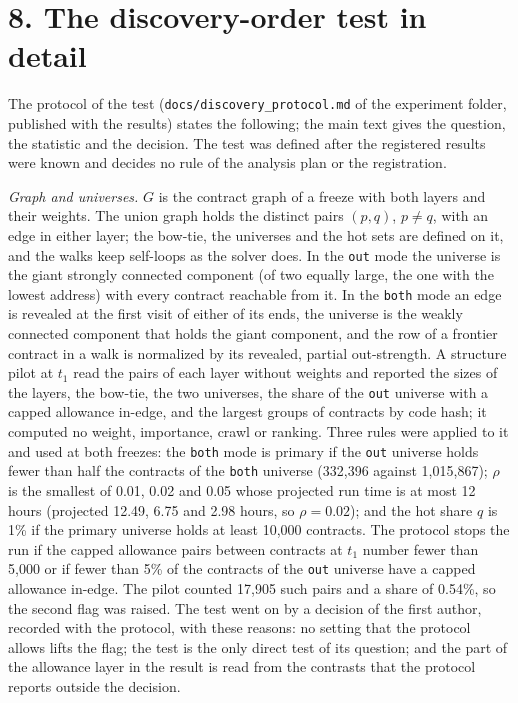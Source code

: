 \documentclass[10pt,letterpaper]{article}
\begin{document}
\section*{8. The discovery-order test in detail}
The protocol of the test (\texttt{docs/discovery\_protocol.md} of the experiment folder, published with the results) states the following; the main text gives the question, the statistic and the decision. The test was defined after the registered results were known and decides no rule of the analysis plan or the registration.

\textit{Graph and universes.} $G$ is the contract graph of a freeze with both layers and their weights. The union graph holds the distinct pairs $(p,q)$, $p\neq q$, with an edge in either layer; the bow-tie, the universes and the hot sets are defined on it, and the walks keep self-loops as the solver does. In the \texttt{out} mode the universe is the giant strongly connected component (of two equally large, the one with the lowest address) with every contract reachable from it. In the \texttt{both} mode an edge is revealed at the first visit of either of its ends, the universe is the weakly connected component that holds the giant component, and the row of a frontier contract in a walk is normalized by its revealed, partial out-strength. A structure pilot at $t_1$ read the pairs of each layer without weights and reported the sizes of the layers, the bow-tie, the two universes, the share of the \texttt{out} universe with a capped allowance in-edge, and the largest groups of contracts by code hash; it computed no weight, importance, crawl or ranking. Three rules were applied to it and used at both freezes: the \texttt{both} mode is primary if the \texttt{out} universe holds fewer than half the contracts of the \texttt{both} universe (332,396 against 1,015,867); $\rho$ is the smallest of 0.01, 0.02 and 0.05 whose projected run time is at most 12 hours (projected 12.49, 6.75 and 2.98 hours, so $\rho=0.02$); and the hot share $q$ is 1\% if the primary universe holds at least 10,000 contracts. The protocol stops the run if the capped allowance pairs between contracts at $t_1$ number fewer than 5,000 or if fewer than 5\% of the contracts of the \texttt{out} universe have a capped allowance in-edge. The pilot counted 17,905 such pairs and a share of 0.54\%, so the second flag was raised. The test went on by a decision of the first author, recorded with the protocol, with these reasons: no setting that the protocol allows lifts the flag; the test is the only direct test of its question; and the part of the allowance layer in the result is read from the contrasts that the protocol reports outside the decision.
\end{document}

